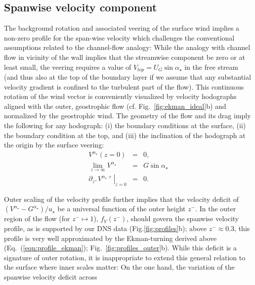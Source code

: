 \documentclass[smallcondensed,final]{svjour3}
\begin{document}
\subsection{Spanwise velocity component}
\label{sec:spanwise} 
%
%
The background rotation and associated veering of the surface wind implies a non-zero profile for the span-wise
velocity which challenges the conventional assumptions related to the channel-flow analogy:
%
While the analogy with channel flow in vicinity of the wall implies that the streamwise component
be zero or at least small, the veering requires a value of $V_{top}=U_G\sin\alpha_\star$ in the free stream
(and thus also at the top of the boundary layer if we assume that any substantial velocity gradient is
confined to the turbulent part of the flow). 
%
This continuous rotation of the wind vector is conveniently visualized by velocity hodographs
aligned with the outer, geostrophic flow (cf. Fig.~\ref{fig:ekman_ideal}b) and normalized by
the geostrophic wind. 
%
The geometry of the flow and its drag imply the following for any hodograph: 
(i) the boundary conditions at the surface,
(ii) the boundary condition at the top, and
(iii) the inclination of the hodograph at the origin by the surface veering:
\begin{subequations} 
\begin{eqnarray} 
  V^{\alpha_\star}(z=0) &=& 0,\\ 
  \lim_{z\rightarrow\infty} V^{\alpha_\star} &=& G \sin\alpha_\star \\ 
  \left.\partial_{z^+} V^{\alpha_\star+}\right|_{z=0} &=& 0.  
\end{eqnarray} 
\end{subequations} 
%
\par
%
Outer scaling of the velocity profile further implies that the velocity deficit of
$(V^{\alpha_\star}-G^{\alpha_\star})/u_\star$ be a universal function of the outer height $z^-$. 
%
In the outer region of the flow (for $z^-\mapsto 1$), $f_V(z^-)$, should govern the
spanwise velocity profile, as is supported by our DNS data (Fig.\ref{fig:profiles}b);
above $z^-\approx 0.3$, this profile is very well approximated by the Ekman-turning derived
above (Eq.~(\ref{eqn:profile_ekman}); Fig.~\ref{fig:profiles_outer}b). 
%
While this deficit is a signature of outer rotation,
it is inappropriate to extend this general relation to the surface where inner
scales matter:
%
On the one hand, the variation of the spanwise velocity deficit across
\end{document}
